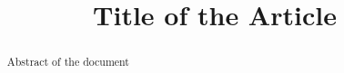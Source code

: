 \documentclass[runningheads,a4paper]{paper}
\begin{document}
\title{ Title of the Article }
\maketitle

\begin{abstract}
Abstract of the document
\end{abstract}

\tableofcontents
\newpage


\end{document}
